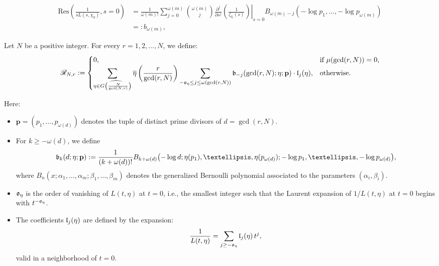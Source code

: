 \documentclass[10pt,a4paper]{amsart}
\begin{document}
\begin{equation}\label{bl}
\begin{split}
\mathrm{Res}\left( \frac{1}{s L(s, \chi_0)}, s=0 \right)
&= \frac{1}{\omega(m)!} \sum_{j=0}^{\omega(m)} \binom{\omega(m)}{j} 
\left. \frac{\partial^j}{\partial s^j} \left( \frac{1}{\zeta_{\mathbb{Q}}(s)} \right) \right|_{s=0}
B_{\omega(m)-j}(-\log p_1, \ldots, -\log p_{\omega(m)}) \\
&=: b_{\omega(m)},
\end{split}
\end{equation}

\begin{definition}\label{def:RNR} Let $N$ be a positive integer.
For every $r = 1, 2, \ldots, N$, we define:
\[
\mathscr{R}_{N,r} := 
\begin{cases}
0, & \text{if } \mu(\gcd(r,N)) = 0, \\
\displaystyle
\sum_{\eta \in \widehat{G\left( \frac{N}{\gcd(N,r)} \right)}} 
\overline{\eta}\left( \frac{r}{\gcd(r,N)} \right) 
\sum_{-\frak{o}_\eta \leq j \leq \omega(\gcd(r,N))} 
\frak{b}_{-j}(\gcd(r,N); \eta; \mathbf{p}) \cdot \frak{l}_j(\eta), & \text{otherwise}.
\end{cases}
\]


Here:


\begin{itemize}
    \item $\mathbf{p} = (p_1, \dots, p_{\omega(d)})$ denotes the tuple of distinct prime divisors of $d = \gcd(r,N)$.
    
    \item For $k \geq -\omega(d)$, we define
    \[
    \frak{b}_k(d; \eta; \mathbf{p}) := 
    \frac{1}{(k + \omega(d))!} 
    B_{k+\omega(d)}\bigl(-\log d; \eta(p_1), \dots, \eta(p_{\omega(d)}); -\log p_1, \dots, -\log p_{\omega(d)}\bigr),
    \]
    where $B_n(x; \alpha_1,\dots,\alpha_m; \beta_1,\dots,\beta_m)$ denotes the generalized Bernoulli polynomial associated to the parameters $(\alpha_i, \beta_i)$.


    \item $\frak{o}_\eta$ is the order of vanishing of $L(t, \eta)$ at $t=0$, i.e., the smallest integer such that the Laurent expansion of $1/L(t,\eta)$ at $t=0$ begins with $t^{-\frak{o}_\eta}$.


    \item The coefficients $\frak{l}_j(\eta)$ are defined by the expansion:
    \[
    \frac{1}{L(t, \eta)} = \sum_{j \geq -\frak{o}_\eta} \frak{l}_j(\eta) \, t^j,
    \]
    valid in a neighborhood of $t=0$.
\end{itemize}
\end{definition}
\end{document}
